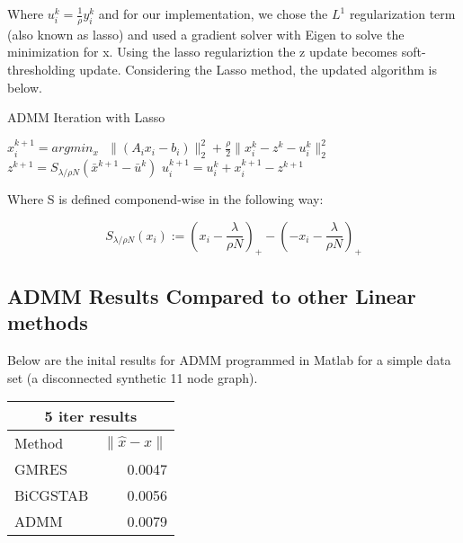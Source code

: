 \documentclass[letterpaper,12pt,onecolumn]{article}
\begin{document}
Where $u_{i}^{k} = \frac{1}{\rho} y_{i}^{k}$ and for our implementation, we chose the $L^{1}$ regularization term (also known as lasso) and used a gradient solver with Eigen to solve the minimization for x. Using the lasso regulariztion the z update becomes soft-thresholding update. Considering the Lasso method, the updated algorithm is below.

\begin{center}
\begin{algorithm}
\caption{ADMM Iteration with Lasso}
\begin{algorithmic}[1]
  \STATE $x_{i}^{k+1} = argmin_{x} \: \: \: \|(A_{i}x_{i} - b_{i})\|_{2}^{2} + \frac{\rho}{2} \| x_{i}^{k} - z^{k} - u_{i}^{k} \|_{2}^{2}$ 
  \STATE $z^{k+1} = S_{\lambda/\rho N} (\bar{x}^{k+1} - \bar{u}^{k})$
	\STATE $u_{i}^{k+1} = u_{i}^{k} + x_{i}^{k+1} - z^{k+1} $ 
  \end{algorithmic}
\end{algorithm}
\end{center}

Where S is defined componend-wise in the following way:
\begin{center}
	\begin{equation}
	  S_{\lambda/\rho N}(x_{i}) := (x_{i} - \frac{\lambda}{\rho N})_{+} - (-x_{i} - \frac{\lambda}{\rho N})_{+}
	\end{equation}
\end{center}

\subsection{ADMM Results Compared to other Linear methods}
Below are the inital results for ADMM programmed in Matlab for a simple data set (a disconnected synthetic 11 node graph). 

\begin{center}
\begin{tabular}{l || r}
	\hline\hline
	\multicolumn{2}{c}{5 iter results} \\
	\hline\hline
	Method  & $\|\hat{x} - x\| $ \\
	\hline
	GMRES & 0.0047  \\
	BiCGSTAB & 0.0056  \\
	ADMM & 0.0079  \\
\end{tabular}
\end{center}
\newpage
\end{document}
